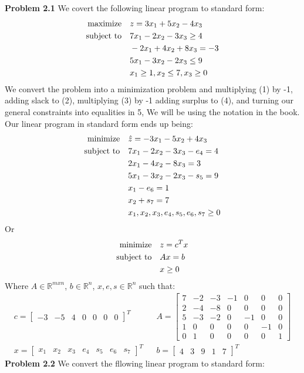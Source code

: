 \documentclass{article}
\begin{document}
 
\pagestyle{fancy}
\textbf{Problem 2.1} We covert the following linear program to standard form:
\begin{align}
    \text{maximize} &\null \quad z = 3x_1 + 5x_2 - 4x_3 \\ 
    \text{subject to} &\null \quad 7x_1 - 2x_2 - 3x_3 \geq 4 \\
    & \quad -2x_1 + 4x_2 + 8x_3 = -3 \\
    & \quad 5x_1 - 3x_2 - 2x_3 \leq 9 \\
    & \quad x_1 \geq 1, x_2 \leq 7, x_3 \geq 0
\end{align}
We convert the problem into a minimization problem and multiplying (1) by -1, adding slack to (2), multiplying (3) by -1 adding surplus to (4), and turning our general constraints into equalities in 5, We will be using the notation in the book. Our linear program in standard form ends up being: \newline
{}
\begin{align}
    \text{minimize} &\null \quad \hat{z} = -3x_1 - 5x_2 + 4x_3 \\ 
    \text{subject to} &\null \quad 7x_1 - 2x_2 - 3x_3 - e_4 = 4 \\
    & \quad 2x_1 - 4x_2 - 8x_3 = 3 \\
    & \quad 5x_1 - 3x_2 - 2x_3 - s_5 = 9 \\
    & \quad x_1 - e_6 = 1 \\
    & \quad x_2 + s_7 = 7 \\
    & \quad x_1, x_2, x_3, e_4, s_5, e_6,s_7 \geq 0
\end{align}
Or 
\begin{align*}
    \text{minimize} &\null \quad z = c^Tx \\ 
    \text{subject to} &\null \quad Ax=b \\
    & \quad x \geq 0
\end{align*}
Where $A \in \mathbb{R}^{mxn}$, $b \in \mathbb{R}^n$, $x, e, s \in \mathbb{R}^n$ such that:  
\begin{align*}c = 
    \begin{bmatrix} 
        -3 & - 5 & 4 & 0 & 0 & 0 & 0
    \end{bmatrix}^T && A =  
    \begin{bmatrix}
        7 & -2 & -3 & -1 & 0 & 0 & 0 \\
        2 & -4 & -8 & 0 & 0 & 0 & 0 \\
        5 & -3 & -2 & 0 & -1 & 0 & 0 \\
        1 & 0 & 0 & 0 & 0 & -1 & 0 \\
        0 & 1 & 0 & 0 & 0 & 0 & 1
    \end{bmatrix} \\ x = 
    \begin{bmatrix}
        x_1 & x_2 & x_3 & e_4 & s_5 & e_6 & s_7
    \end{bmatrix}^T && b = 
    \begin{bmatrix}
        4 & 3 & 9 & 1 & 7
    \end{bmatrix}^T
\end{align*} \newline
\textbf{Problem 2.2} We convert the fllowing linear program to standard form:
\end{document}
